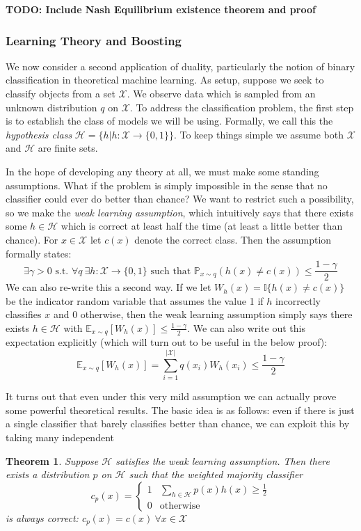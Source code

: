 \documentclass[12pt]{article}
\newcommand*{\abs}[1]{\left\lvert#1\right\rvert}
\newcommand{\E}{\mathbb{E}}
\newcommand{\Prob}{\mathbb{P}}
\newtheorem{thm}{Theorem}
\begin{document}
\textbf{TODO: Include Nash Equilibrium existence theorem and proof}


\subsubsection{Learning Theory and Boosting}
We now consider a second application of duality, particularly the notion of binary classification in theoretical machine learning. As setup, suppose we seek to classify objects from a set
$\mathcal{X}$. We observe data which is sampled from an unknown distribution $q$ on $\mathcal{X}$. To address the classification problem, the first step is to establish the class of 
models we will be using. Formally, we call this the \textit{hypothesis class} $\mathcal{H} = \{h | h: \mathcal{X} \to \{0, 1\}\}$. To keep things simple we assume both $\mathcal{X}$ and 
$\mathcal{H}$ are finite sets. 

In the hope of developing any theory at all, we must make some standing 
assumptions. What if the problem is simply impossible in the sense that no classifier could ever do better than chance? We want to restrict such a possibility, so we make the \textit{weak learning assumption}, 
which intuitively says that there exists some $h \in \mathcal{H}$ which is correct at least half the time (at least a little better than chance). For $x \in \mathcal{X}$ let $c(x)$ denote the correct class. Then the 
assumption formally states: 
\[\exists \gamma > 0 \text{ s.t. } \forall q \ \exists h: \mathcal{X} \to \{0, 1\} \text{ such that } \Prob_{x \sim q}\left(h(x) \neq c(x)\right) \leq \frac{1 - \gamma}{2}\]
We can also re-write this a second way. If we let $W_{h}(x) = \mathbb{I}\{h(x) \neq c(x)\}$ be the indicator random variable that assumes the value 1 if $h$ incorrectly classifies $x$ and $0$ otherwise, then 
the weak learning assumption simply says there exists $h \in \mathcal{H}$ with $\E_{x \sim q} [W_h(x)] \leq \frac{1 - \gamma}{2}$. We can also write out this expectation explicitly (which will turn out to be useful
in the below proof): 
\[\E_{x \sim q} [W_h(x)] = \sum_{i = 1}^{\abs{\mathcal{X}}} q(x_i) W_h(x_i) \leq \frac{1 - \gamma}{2}\] 

It turns out that even under this very mild assumption we can actually prove some powerful theoretical results. The basic idea is as follows: even if there is just a single classifier that barely classifies better than 
chance, we can exploit this by taking many independent 

\begin{thm}
Suppose $\mathcal{H}$ satisfies the weak learning assumption. Then there exists a distribution $p$ on $\mathcal{H}$ such that the weighted majority classifier 
\[c_p(x) = \begin{cases} 
      1 & \sum_{h \in \mathcal{H}} p(x)h(x) \geq \frac{1}{2} \\
      0 & \text{otherwise}
   \end{cases}
\]
is always correct: $c_p(x) = c(x) \ \forall x \in \mathcal{X}$
\end{thm}
\end{document}
